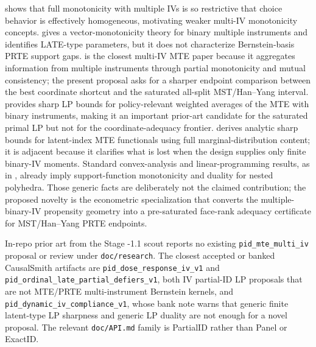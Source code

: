 \documentclass[11pt]{article}
\theoremstyle{definition}
\theoremstyle{plain}
\theoremstyle{remark}
\begin{document}
\citet{MogstadTorgovitskyWalters2021} shows that full monotonicity with
multiple IVs is so restrictive that choice behavior is effectively
homogeneous, motivating weaker multi-IV monotonicity concepts.  \citet{Goff2024}
gives a vector-monotonicity theory for binary multiple instruments and
identifies LATE-type parameters, but it does not characterize Bernstein-basis
PRTE support gaps.  \citet{MogstadTorgovitskyWalters2024} is the closest
multi-IV MTE paper because it aggregates information from multiple instruments
through partial monotonicity and mutual consistency; the present proposal asks
for a sharper endpoint comparison between the best coordinate shortcut and the
saturated all-split MST/Han--Yang interval.
\citet{HanYang2024}
provides sharp LP bounds for policy-relevant weighted averages of the MTE with
binary instruments, making it an important prior-art candidate for the
saturated primal LP but not for the coordinate-adequacy frontier.  \citet{Marx2024}
derives analytic sharp bounds for latent-index MTE functionals using full
marginal-distribution content; it is adjacent because it clarifies what is
lost when the design supplies only finite binary-IV moments.
Standard convex-analysis and linear-programming results, as in
\citet{Rockafellar1970}, already imply support-function monotonicity and
duality for nested polyhedra.  Those generic facts are deliberately not the
claimed contribution; the proposed novelty is the econometric specialization
that converts the multiple-binary-IV propensity geometry into a
pre-saturated face-rank adequacy certificate for MST/Han--Yang PRTE endpoints.

In-repo prior art from the Stage -1.1 scout reports no existing
\texttt{pid\_mte\_multi\_iv} proposal or review under
\texttt{doc/research}.  The closest accepted or banked
CausalSmith artifacts are \texttt{pid\_dose\_response\_iv\_v1} and
\texttt{pid\_ordinal\_late\_partial\_defiers\_v1}, both IV partial-ID LP
proposals that are not MTE/PRTE multi-instrument Bernstein kernels, and
\texttt{pid\_dynamic\_iv\_compliance\_v1}, whose bank note warns that generic
finite latent-type LP sharpness and generic LP duality are not enough for a
novel proposal.  The relevant \texttt{doc/API.md} family is PartialID rather
than Panel or ExactID.
\end{document}
